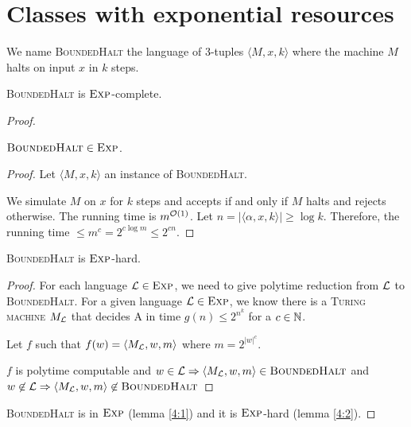 \section{Classes with exponential resources}

We name \textsc{BoundedHalt} the language of 3-tuples $\langle M,x,k\rangle$ where the machine $M$ halts on input $x$ in $k$ steps.

\begin{thm}
    \textsc{BoundedHalt} is $\textsc{Exp}$-complete.
\end{thm}
\begin{proof}

\begin{lemma}\label{4:1}
    $\textsc{BoundedHalt} \in \textsc{Exp}$.
\end{lemma}
\begin{proof}
Let $\langle M,x,k\rangle$ an instance of \textsc{BoundedHalt}.

We simulate $M$ on $x$ for $k$ steps and accepts if and only if $M$ halts and rejects otherwise. The running time is $m^{\mathcal O \left( 1 \right)}$. Let $n = \vert \langle\alpha,x,k\rangle \vert \geqslant \log k$. Therefore, the running time $\leqslant m^c = 2^{c\log m} \leqslant 2^{cn}$.
\end{proof}

\begin{lemma}\label{4:2}
    \textsc{BoundedHalt} is $\textsc{Exp}$-hard.
\end{lemma}
\begin{proof}
For each language $\mathcal{L} \in \textsc{Exp}$, we need to give polytime reduction from $\mathcal{L}$ to \textsc{BoundedHalt}. For a given language $\mathcal{L} \in \textsc{Exp}$, we know there is a \textsc{Turing machine} $M_{\mathcal{L}}$ that decides A in time $g(n) \leqslant 2^{n^k}$ for a $c\in\mathbb{N}$.

Let $f$ such that $f(w) = \langle M_{\mathcal{L}}, w, m\rangle$ where $m = 2^{|w|^c}$.

$f$ is polytime computable and $w \in \mathcal{L} \Rightarrow \langle M_{\mathcal{L}}, w, m\rangle \in \textsc{BoundedHalt}$ and $w \not\in \mathcal{L} \Rightarrow \langle M_{\mathcal{L}}, w, m\rangle \not\in \textsc{BoundedHalt}$
\end{proof}
    \textsc{BoundedHalt} is in $\textsc{Exp}$ (lemma \ref{4:1}) and it is $\textsc{Exp}$-hard (lemma \ref{4:2}).
\end{proof}

